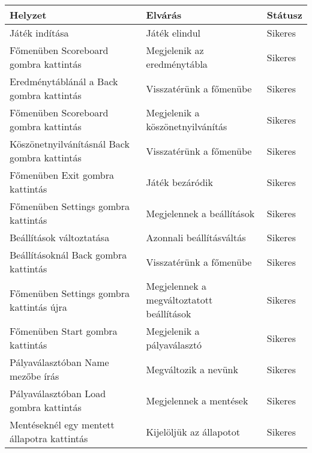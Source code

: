 \begin{center}
	\begin{longtable}{| m{} | m{} | m{}|} 
		\hline
		\textbf{Helyzet} & \textbf{Elvárás} & \textbf{Státusz}\\ \hline \hline
		
		Játék indítása & Játék elindul & Sikeres\\ \hline
		
		Főmenüben Scoreboard gombra kattintás & Megjelenik az eredménytábla & Sikeres\\ \hline
		
		Eredménytáblánál a Back gombra kattintás & Visszatérünk a főmenübe & Sikeres\\ \hline
		
		Főmenüben Scoreboard gombra kattintás & Megjelenik a köszönetnyilvánítás & Sikeres\\ \hline
		
		Köszönetnyilvánításnál Back gombra kattintás & Visszatérünk a főmenübe & Sikeres\\ \hline
		
		Főmenüben Exit gombra kattintás & Játék bezáródik & Sikeres\\ \hline
		
		Főmenüben Settings gombra kattintás &  Megjelennek a beállítások & Sikeres\\ \hline
		
		Beállítások változtatása & Azonnali beállításváltás & Sikeres\\ \hline
		
		Beállításoknál Back gombra kattintás & Visszatérünk a főmenübe & Sikeres\\ \hline
		
		Főmenüben Settings gombra kattintás újra &  Megjelennek a megváltoztatott beállítások & Sikeres\\ \hline
		
		Főmenüben Start gombra kattintás & Megjelenik a pályaválasztó & Sikeres\\ \hline
			
		Pályaválasztóban Name mezőbe írás & Megváltozik a nevünk & Sikeres\\ \hline
		
		Pályaválasztóban Load gombra kattintás & Megjelennek a mentések & Sikeres\\ \hline
		
		Mentéseknél egy mentett állapotra kattintás & Kijelöljük az állapotot & Sikeres\\ \hline
		

\end{longtable}
\end{center}
